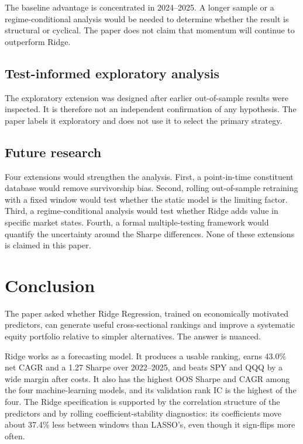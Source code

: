 \documentclass[11pt,a4paper]{article}
\begin{document}
The baseline advantage is concentrated in 2024--2025. A longer sample or a regime-conditional analysis would be needed to determine whether the result is structural or cyclical. The paper does not claim that momentum will continue to outperform Ridge.

\subsection{Test-informed exploratory analysis}

The exploratory extension was designed after earlier out-of-sample results were inspected. It is therefore not an independent confirmation of any hypothesis. The paper labels it exploratory and does not use it to select the primary strategy.

\subsection{Future research}

Four extensions would strengthen the analysis. First, a point-in-time constituent database would remove survivorship bias. Second, rolling out-of-sample retraining with a fixed window would test whether the static model is the limiting factor. Third, a regime-conditional analysis would test whether Ridge adds value in specific market states. Fourth, a formal multiple-testing framework would quantify the uncertainty around the Sharpe differences. None of these extensions is claimed in this paper.


\section{Conclusion}
\label{sec:conclusion}

The paper asked whether Ridge Regression, trained on economically motivated predictors, can generate useful cross-sectional rankings and improve a systematic equity portfolio relative to simpler alternatives. The answer is nuanced.

Ridge works as a forecasting model. It produces a usable ranking, earns 43.0\% net CAGR and a 1.27 Sharpe over 2022--2025, and beats SPY and QQQ by a wide margin after costs. It also has the highest OOS Sharpe and CAGR among the four machine-learning models, and its validation rank IC is the highest of the four. The Ridge specification is supported by the correlation structure of the predictors and by rolling coefficient-stability diagnostics: its coefficients move about 37.4\% less between windows than LASSO's, even though it sign-flips more often.
\end{document}
